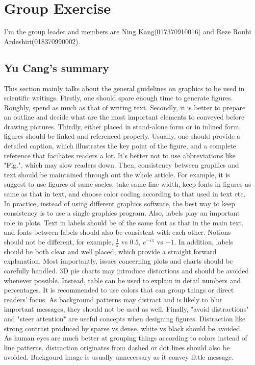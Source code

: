 \documentclass[paper=a4, fontsize=11pt]{scrartcl} %
\numberwithin{equation}{section} %
\numberwithin{figure}{section} %
\numberwithin{table}{section} %
\begin{document}
\section{Group Exercise}
	I'm the group leader and members are Ning Kang(017370910016) and Reze Rouhi Ardeshiri(018370990002).
	
	\subsection{Yu Cang's summary}
		This section mainly talks about the general guidelines on graphics to be used in scientific writings. \newline
		Firstly, one should spare enough time to generate figures. Roughly, spend as much as that of writing text.\newline 
		Secondly, it is better to prepare an outline and decide what are the most important elements to conveyed before drawing pictures.\newline 
		Thirdly, either placed in stand-alone form or in inlined form, figures should be linked and referenced properly. Usually, one should provide a detailed caption, which illustrates the key point of the figure, and a complete reference that faciliates readers a lot. It's better not to use abbreviations like "Fig.", which may slow readers down. \newline
		Then, consistency between graphics and text should be maintained through out the whole article. For example, it is suggest to use figures of same sacles, take same line width, keep fonts in figures as same as that in text, and choose color coding according to that used in text etc. In practice, instead of using different graphics software, the best way to keep consistency is to use a single graphics program. \newline
		Also, labels play an important role in plots. Text in labels should be of the same font as that in the main text, and fonts between labels should also be consistent with each other. Notions should not be different, for example, $\frac{1}{2}$ vs $0.5$, $e^{-i\pi}$ vs $-1$. In addition, labels should be both clear and well placed, which provide a straight forward explanation.\newline
		Most importantly, issues concerning plots and charts should be carefully handled. 3D pie charts may introduce distortions and should be avoided whenever possible. Instead, table can be used to explain in detail numbers and percentages. It is recommended to use colors that can group things or direct readers' focus. As background patterns may distract and is likely to blur important messages, they should not be used as well. \newline
		Finally, "avoid distractions" and "steer attention" are useful concepts when designing figures. Distraction like strong contrast produced by sparse vs dense, white vs black should be avoided. As human eyes are much better at grouping things according to colors instead of line patterns, distraction originates from dashed or dot lines should also be avoided. Backgourd image is usually unnecessary as it convey little message.  
		
\end{document}
